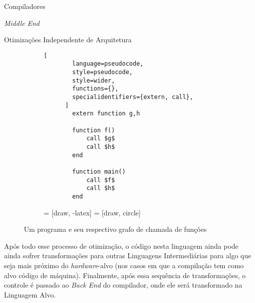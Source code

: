 \begin{section}{Compiladores}
\begin{subsection}{\textit{Middle End}}
\begin{subsubsection}{Otimizações Independente de Arquitetura}
\begin{figure}[ht]
\centering
  \begin{subfigure}[b]{0.40\textwidth}
      \begin{lstlisting}[
        language=pseudocode,
        style=pseudocode,
        style=wider,
        functions={},
        specialidentifiers={extern, call},
      ]
        extern function g,h

        function f()
            call $g$
            call $h$
        end

        function main()
            call $f$
            call $h$
        end
      \end{lstlisting}
  \end{subfigure}
  \begin{subfigure}[b]{0.40\textwidth}
     = [draw, -latex]
     = [draw, circle]
    \begin{center}
    \end{center}
  \end{subfigure}
  \caption{Um programa e seu respectivo grafo de chamada de funções}
  \label{fig:call_graph}
\end{figure}
    Após todo esse processo de otimização, o código nesta linguagem ainda
pode ainda sofrer transformações para outras Linguagens
Intermediárias para algo que seja mais próximo do
\textit{hardware}-alvo (nos casos em que a compilação tem como alvo código de máquina).
Finalmente, após essa sequência de transformações, o controle é
passado ao \textit{Back End} do compilador, onde ele será transformado na
Linguagem Alvo.

\end{subsubsection}

\end{subsection}


\end{section}

